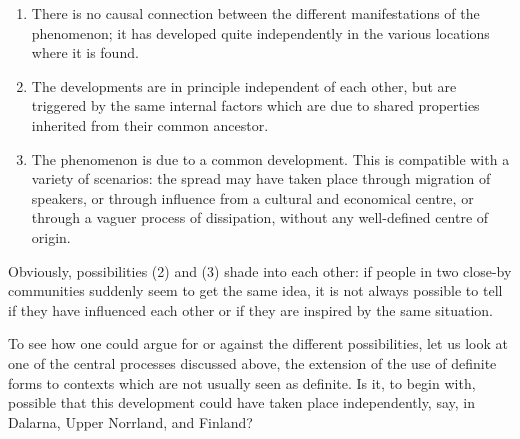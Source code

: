 \begin{enumerate} %
\item 
There is no causal connection between the different manifestations of the phenomenon; it has developed quite independently in the various locations where it is found. 

\item 
The developments are in principle independent of each other, but are triggered by the same internal factors which are due to shared properties inherited from their common ancestor. 

\item 
The phenomenon is due to a common development. This is compatible with a variety of scenarios: the spread may have taken place through migration of speakers, or through influence from a cultural and economical centre, or through a vaguer process of dissipation, without any well-defined centre of origin. 

\end{enumerate} %
Obviously, possibilities (2) and (3) shade into each other: if people in two close-by communities suddenly seem to get the same idea, it is not always possible to tell if they have influenced each other or if they are inspired by the same situation. 

To see how one could argue for or against the different possibilities, let us look at one of the central processes discussed above, the extension of the use of definite forms to contexts which are not usually seen as definite. Is it, to begin with, possible that this development could have taken place independently, say, in Dalarna, Upper Norrland, and Finland? 

